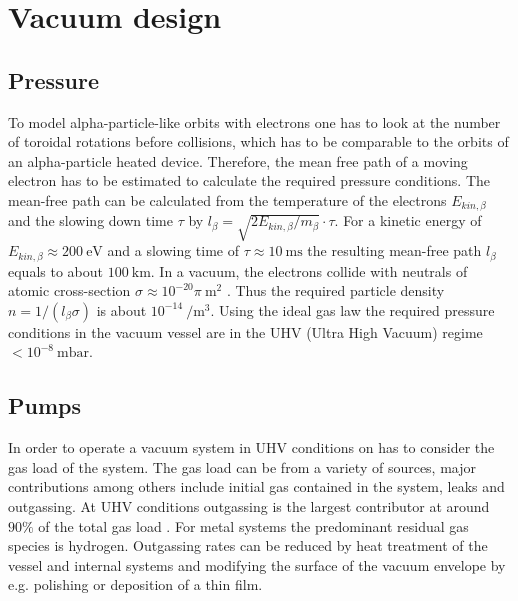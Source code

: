 \chapter{Vacuum design}

\section{Pressure}

To model alpha-particle-like orbits with electrons one has to look at the number of toroidal rotations before collisions, which has to be comparable to the orbits of an alpha-particle heated device.
Therefore, the mean free path of a moving electron has to be estimated to calculate the required pressure conditions.
The mean-free path can be calculated from the temperature of the electrons $E_{kin, \beta}$ and the slowing down time $\tau$ by $l_{\beta} = \sqrt{2E_{kin, \beta}/m_{\beta}}\cdot\tau$.
For a kinetic energy of $E_{kin, \beta} \approx 200~\si{\electronvolt}$ and a slowing time of $\tau \approx \SI{10}{\milli\second}$ the resulting mean-free path $l_{\beta}$ equals to about $\SI{100}~\si{\kilo\meter}$.
In a vacuum, the electrons collide with neutrals of atomic cross-section $\sigma \approx 10^{-20}\pi ~\si{\square\meter}$ \cite{ALPS}.
Thus the required particle density $n=1/(l_{\beta}\sigma)$ is about $10^{-14}~\si{\per\cubic\meter}$.
Using the ideal gas law the required pressure conditions in the vacuum vessel are in the UHV (Ultra High Vacuum) regime $<10^{-8}~\si{\milli\bar}$.

\section{Pumps}

In order to operate a vacuum system in UHV conditions on has to consider the gas load of the system.
The gas load can be from a variety of sources, major contributions among others include initial gas contained in the system, leaks and outgassing.
At UHV conditions outgassing is the largest contributor at around $90\%$ of the total gas load \cite{outgassing}.
For metal systems the predominant residual gas species is hydrogen.
Outgassing rates can be reduced by heat treatment of the vessel and internal systems and modifying the surface of the vacuum envelope by e.g. polishing or deposition of a thin film.

